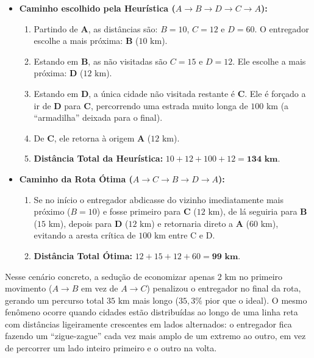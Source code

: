 \begin{itemize}
    \item \textbf{Caminho escolhido pela Heurística ($A \rightarrow B \rightarrow D \rightarrow C \rightarrow A$):}
    \begin{enumerate}
        \item Partindo de \textbf{A}, as distâncias são: $B=10$, $C=12$ e $D=60$. O entregador escolhe a mais próxima: \textbf{B} ($10\text{ km}$).
        \item Estando em \textbf{B}, as não visitadas são $C=15$ e $D=12$. Ele escolhe a mais próxima: \textbf{D} ($12\text{ km}$).
        \item Estando em \textbf{D}, a única cidade não visitada restante é \textbf{C}. Ele é forçado a ir de \textbf{D} para \textbf{C}, percorrendo uma estrada muito longa de $100\text{ km}$ (a ``armadilha'' deixada para o final).
        \item De \textbf{C}, ele retorna à origem \textbf{A} ($12\text{ km}$).
        \item \textbf{Distância Total da Heurística:} $10 + 12 + 100 + 12 = \mathbf{134\text{ km}}$.
    \end{enumerate}
    \item \textbf{Caminho da Rota Ótima ($A \rightarrow C \rightarrow B \rightarrow D \rightarrow A$):}
    \begin{enumerate}
        \item Se no início o entregador abdicasse do vizinho imediatamente mais próximo ($B=10$) e fosse primeiro para \textbf{C} ($12\text{ km}$), de lá seguiria para \textbf{B} ($15\text{ km}$), depois para \textbf{D} ($12\text{ km}$) e retornaria direto a \textbf{A} ($60\text{ km}$), evitando a aresta crítica de $100\text{ km}$ entre C e D.
        \item \textbf{Distância Total Ótima:} $12 + 15 + 12 + 60 = \mathbf{99\text{ km}}$.
    \end{enumerate}
\end{itemize}

Nesse cenário concreto, a sedução de economizar apenas $2\text{ km}$ no primeiro movimento ($A \rightarrow B$ em vez de $A \rightarrow C$) penalizou o entregador no final da rota, gerando um percurso total $35\text{ km}$ mais longo ($35,3\%$ pior que o ideal). O mesmo fenômeno ocorre quando cidades estão distribuídas ao longo de uma linha reta com distâncias ligeiramente crescentes em lados alternados: o entregador fica fazendo um ``zigue-zague'' cada vez mais amplo de um extremo ao outro, em vez de percorrer um lado inteiro primeiro e o outro na volta.
